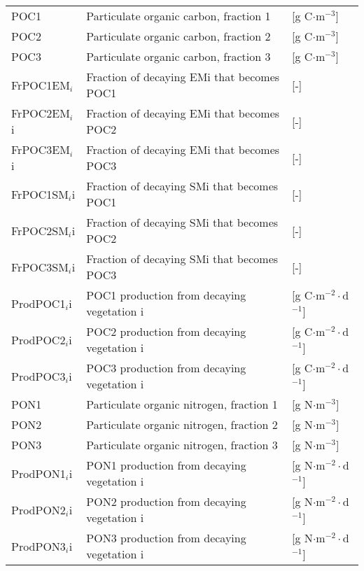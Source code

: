 \begin{tabular}{lll}
POC1           & Particulate organic carbon, fraction 1         & [g C$\cdot$m$^{-3}$]                \\
POC2           & Particulate organic carbon, fraction 2         & [g C$\cdot$m$^{-3}$]                \\
POC3           & Particulate organic carbon, fraction 3         & [g C$\cdot$m$^{-3}$]                \\
FrPOC1EM$_i$   & Fraction of decaying EMi that becomes POC1     & [-]                                 \\
FrPOC2EM$_i$i  & Fraction of decaying EMi that becomes POC2     & [-]                                 \\
FrPOC3EM$_i$i  & Fraction of decaying EMi that becomes POC3     & [-]                                 \\
FrPOC1SM$_i$i  & Fraction of decaying SMi that becomes POC1     & [-]                                 \\
FrPOC2SM$_i$i  & Fraction of decaying SMi that becomes POC2     & [-]                                 \\
FrPOC3SM$_i$i  & Fraction of decaying SMi that becomes POC3     & [-]                                 \\
ProdPOC1$_i$i  & POC1 production from decaying vegetation i     & [g C$\cdot$m$^{-2}\cdot$d$^{-1}$]   \\
ProdPOC2$_i$i  & POC2 production from decaying vegetation i     & [g C$\cdot$m$^{-2}\cdot$d$^{-1}$]   \\
ProdPOC3$_i$i  & POC3 production from decaying vegetation i     & [g C$\cdot$m$^{-2}\cdot$d$^{-1}$]   \\
PON1           & Particulate organic nitrogen, fraction 1       & [g N$\cdot$m$^{-3}$]                \\
PON2           & Particulate organic nitrogen, fraction 2       & [g N$\cdot$m$^{-3}$]                \\
PON3           & Particulate organic nitrogen, fraction 3       & [g N$\cdot$m$^{-3}$]                \\
ProdPON1$_i$i  & PON1 production from decaying vegetation i     & [g N$\cdot$m$^{-2}\cdot$d$^{-1}$]   \\
ProdPON2$_i$i  & PON2 production from decaying vegetation i     & [g N$\cdot$m$^{-2}\cdot$d$^{-1}$]   \\
ProdPON3$_i$i  & PON3 production from decaying vegetation i     & [g N$\cdot$m$^{-2}\cdot$d$^{-1}$]   \\

\end{tabular}
